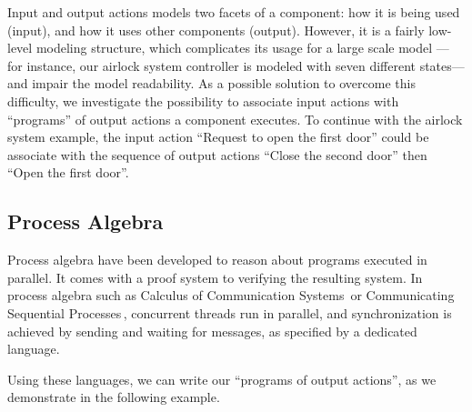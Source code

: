Input and output actions models two facets of a component: how it is being used
(input), and how it uses other components (output).
%
However, it is a fairly low-level modeling structure, which complicates its
usage for a large scale model --- for instance, our airlock system controller is
modeled with seven different states--- and impair the model readability.
%
As a possible solution to overcome this difficulty, we investigate the
possibility to associate input actions with ``programs'' of output actions a
component executes.
%
To continue with the airlock system example, the input action ``Request to open
the first door'' could be associate with the sequence of output actions ``Close
the second door'' then ``Open the first door''. 

\subsection{Process Algebra}
\label{subsec:sota:palgebra}

Process algebra have been developed to reason about programs executed in
parallel. It comes with a proof system to verifying the resulting system. 
%
In process algebra such as Calculus of Communication
Systems\,\cite{milner1980ccs} or Communicating Sequential
Processes\,\cite{hoare1978csp}, concurrent threads run in parallel, and
synchronization is achieved by sending and waiting for messages, as specified by
a dedicated language.

Using these languages, we can write our ``programs of output actions'', as we
demonstrate in the following example.

